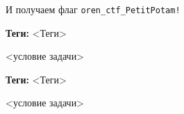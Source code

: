 \documentclass[idxtotoc,hyperref,openany,oneside]{files/pwn} %
\begin{document}
И получаем флаг \verb|oren_ctf_PetitPotam!|




\textbf{Теги:} <Теги>\vspace{\baselineskip}

\begin{tcolorbox}
<условие задачи>
\end{tcolorbox}



\textbf{Теги:} <Теги>\vspace{\baselineskip}

\begin{tcolorbox}
<условие задачи>
\end{tcolorbox}

\end{document}
